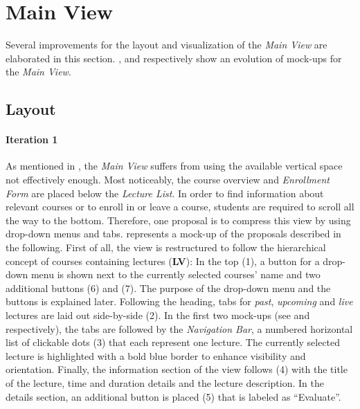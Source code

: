 \section{Main View}
Several improvements for the layout and visualization of the \emph{Main View} are elaborated in this section. ,  and  respectively show an evolution of mock-ups for the \emph{Main View}.
\subsection{Layout}
\label{section:con:proposals:mainview:layout}
\paragraph{Iteration 1}
As mentioned in , the \emph{Main View} suffers from using the available vertical space not effectively enough. Most noticeably, the course overview and \emph{Enrollment Form} are placed below the \emph{Lecture List}. In order to find information about relevant courses or to enroll in or leave a course, students are required to scroll all the way to the bottom. 
Therefore, one proposal is to compress this view by using drop-down menus and tabs.   represents a mock-up of the proposals described in the following. 
First of all, the view is restructured to follow the hierarchical concept of courses containing lectures (\textbf{LV}): In the top (1), a button for a drop-down menu is shown next to the currently selected courses' name and two additional buttons (6) and (7). The purpose of the drop-down menu and the buttons is explained later.
Following the heading, tabs for \emph{past}, \emph{upcoming} and \emph{live} lectures are laid out side-by-side (2). In the first two mock-ups (see  and  respectively), the tabs are followed by the \emph{Navigation Bar}, a numbered horizontal list of clickable dots (3) that each represent one lecture. The currently selected lecture is highlighted with a bold blue border to enhance visibility and orientation. Finally, the information section of the view follows (4) with the title of the lecture, time and duration details and the lecture description. In the details section, an additional button is placed (5) that is labeled as “Evaluate”.
